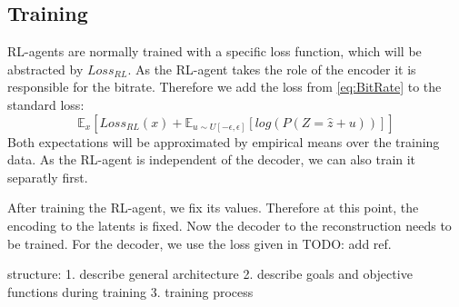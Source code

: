     

    
    


    




\subsection{Training}
    RL-agents are normally trained with a specific loss function, which will be
    abstracted by $Loss_{RL}$. As the RL-agent takes the role of the encoder it
    is responsible for the bitrate. Therefore we add the loss from
    \ref{eq:BitRate} to the standard loss:
    \begin{equation}
        \mathbb{E}_{x}[Loss_{RL}(x) + \mathbb{E}_{u \sim U[-\epsilon, \epsilon]}[log(P(Z=\hat{z} + u))]]
    \end{equation}
    Both expectations will be approximated by empirical means over the training
    data. As the RL-agent is independent of the decoder, we can also train it
    separatly first.

    After training the RL-agent, we fix its values. Therefore at this point, the
    encoding to the latents is fixed. Now the decoder to the reconstruction
    needs to be trained. For the decoder, we use the loss given in TODO: add ref. 











structure:
1. describe general architecture
2. describe goals and objective functions during training
3. training process